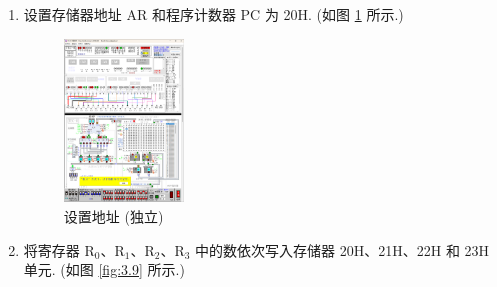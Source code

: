 \documentclass[../main.tex]{subfiles}
\begin{document}
\begin{enumerate}
    \item 设置存储器地址 AR 和程序计数器 PC 为 20H. (如图 \ref{fig:3.8} 所示.)

          \begin{figure}[htbp]
              \centering
              \includegraphics[width=0.3\textwidth]{screenshots/3.2.6.png}
              \caption{设置地址 (独立)}
              \label{fig:3.8}
          \end{figure}

    \item 将寄存器 R$_0$、R$_1$、R$_2$、R$_3$ 中的数依次写入存储器 20H、21H、22H 和 23H 单元. (如图 \ref{fig:3.9} 所示.)


\end{enumerate}
\end{document}

